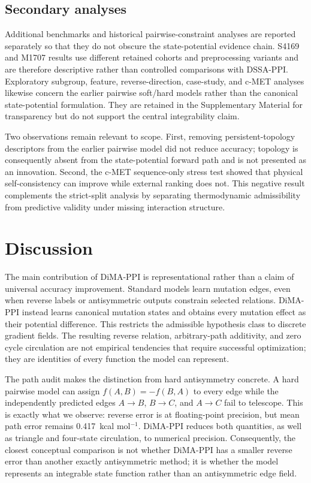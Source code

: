 \documentclass[preprint,12pt]{elsarticle}
\begin{document}
\subsection{Secondary analyses}

Additional benchmarks and historical pairwise-constraint analyses are reported separately so that they do not obscure the state-potential evidence chain. S4169 and M1707 results use different retained cohorts and preprocessing variants and are therefore descriptive rather than controlled comparisons with DSSA-PPI. Exploratory subgroup, feature, reverse-direction, case-study, and c-MET analyses likewise concern the earlier pairwise soft/hard models rather than the canonical state-potential formulation. They are retained in the Supplementary Material for transparency but do not support the central integrability claim.

Two observations remain relevant to scope. First, removing persistent-topology descriptors from the earlier pairwise model did not reduce accuracy; topology is consequently absent from the state-potential forward path and is not presented as an innovation. Second, the c-MET sequence-only stress test showed that physical self-consistency can improve while external ranking does not. This negative result complements the strict-split analysis by separating thermodynamic admissibility from predictive validity under missing interaction structure.

\section{Discussion}
\label{sec:discussion}

The main contribution of DiMA-PPI is representational rather than a claim of universal accuracy improvement. Standard models learn mutation edges, even when reverse labels or antisymmetric outputs constrain selected relations. DiMA-PPI instead learns canonical mutation states and obtains every mutation effect as their potential difference. This restricts the admissible hypothesis class to discrete gradient fields. The resulting reverse relation, arbitrary-path additivity, and zero cycle circulation are not empirical tendencies that require successful optimization; they are identities of every function the model can represent.

The path audit makes the distinction from hard antisymmetry concrete. A hard pairwise model can assign $f(A,B)=-f(B,A)$ to every edge while the independently predicted edges $A\rightarrow B$, $B\rightarrow C$, and $A\rightarrow C$ fail to telescope. This is exactly what we observe: reverse error is at floating-point precision, but mean path error remains 0.417~kcal mol$^{-1}$. DiMA-PPI reduces both quantities, as well as triangle and four-state circulation, to numerical precision. Consequently, the closest conceptual comparison is not whether DiMA-PPI has a smaller reverse error than another exactly antisymmetric method; it is whether the model represents an integrable state function rather than an antisymmetric edge field.
\end{document}
